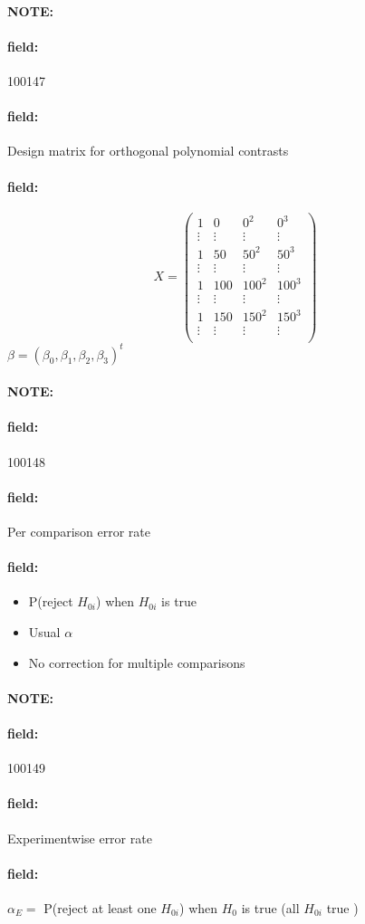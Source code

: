 \documentclass[12pt]{article}
\newenvironment{note}{\paragraph{NOTE:}}{}
\newenvironment{field}{\paragraph{field:}}{}
\begin{document}
\begin{note}
    \begin{field}
        \tiny 100147
    \end{field}
    \begin{field}
        Design matrix for orthogonal polynomial contrasts
    \end{field}
    \begin{field}
        $$ X = \begin{pmatrix}
              1 & 0 & 0^2 & 0^3\\
              \vdots & \vdots & \vdots & \vdots \\
              1 & 50 & 50^2 & 50^3 \\
              \vdots & \vdots & \vdots & \vdots \\
              1 & 100 & 100^2 & 100^3 \\
              \vdots & \vdots & \vdots & \vdots \\
              1 & 150 & 150^2 & 150^3 \\
              \vdots & \vdots & \vdots & \vdots \\
        \end{pmatrix}$$
        $ \beta = (\beta_0, \beta_1, \beta_2, \beta_3)^t$
    \end{field}
\end{note}


\begin{note}
    \begin{field}
        \tiny 100148
    \end{field}
    \begin{field}
        Per comparison error rate
    \end{field}
    \begin{field}
        \begin{itemize}
          \item P(reject $H_{0i}$) when $H_{0i}$ is true
          \item Usual $\alpha$
          \item No correction for multiple comparisons
        \end{itemize}
    \end{field}
\end{note}

\begin{note}
    \begin{field}
        \tiny 100149
    \end{field}
    \begin{field}
        Experimentwise error rate
    \end{field}
    \begin{field}
        $\alpha_E = $ P(reject at least one $H_{0i}$) when $H_0$ is true (all $H_{0i}$ true )
    \end{field}
\end{note}
\end{document}

